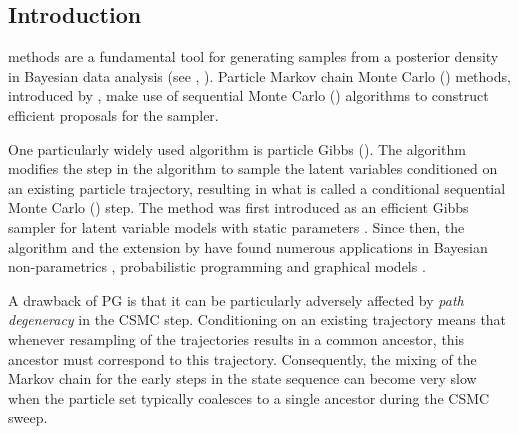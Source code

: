 
\subsection{Introduction}
\label{sec:ipmcmc:intro}

\mcmc methods are a fundamental tool for generating samples from a posterior density in Bayesian data analysis (see \eg, \citet{robert2013monte}). Particle Markov chain Monte Carlo (\pmcmc) methods, introduced by \citet{andrieuDH2010}, make use of sequential Monte Carlo (\smc) algorithms \citep{gordon1993novel,doucet2001sequential} to construct efficient proposals for the \mcmc sampler. 

One particularly widely used \pmcmc algorithm is particle Gibbs (\pg). The \pg algorithm modifies the \smc step in the \pmcmc algorithm to sample the latent variables conditioned on an existing particle trajectory, resulting in what is called a conditional sequential Monte Carlo (\csmc) step. The \pg method was first introduced as an efficient Gibbs sampler for latent variable models with static parameters \citep{andrieuDH2010}. Since then, the \pg algorithm and the extension by \citet{lindstenJS2014} have found numerous applications in \eg Bayesian non-parametrics \citep{ValeraFSPC2015,tripuraneni2015}, probabilistic programming \citep{wood2014new,vandemeent_aistats_2015} and graphical models \citep{everitt2012,naessethLS2014,naessethLS2015nested}.  

A drawback of PG is that it can be particularly adversely affected by \emph{path degeneracy} in the CSMC step.  Conditioning on an existing trajectory means that whenever resampling of the trajectories results in a common ancestor, this ancestor must correspond to this trajectory.  Consequently, the mixing of the Markov chain for the early steps in the state sequence can become very slow when the particle set typically coalesces to a single ancestor during the CSMC sweep.

